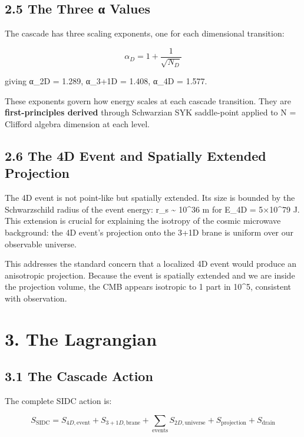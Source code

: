 \hypertarget{the-three-ux3b1-values}{%
\subsection{2.5 The Three α Values}\label{the-three-ux3b1-values}}

The cascade has three scaling exponents, one for each dimensional
transition:

\[\alpha_D = 1 + \frac{1}{\sqrt{N_D}}\]

giving α\_2D = 1.289, α\_3+1D = 1.408, α\_4D = 1.577.

These exponents govern how energy scales at each cascade transition.
They are \textbf{first-principles derived} through Schwarzian SYK
saddle-point applied to N = Clifford algebra dimension at each level.

\hypertarget{the-4d-event-and-spatially-extended-projection}{%
\subsection{2.6 The 4D Event and Spatially Extended
Projection}\label{the-4d-event-and-spatially-extended-projection}}

The 4D event is not point-like but spatially extended. Its size is
bounded by the Schwarzschild radius of the event energy: r\_s
\textasciitilde{} 10\^{}36 m for E\_4D = 5×10\^{}79 J. This extension is
crucial for explaining the isotropy of the cosmic microwave background:
the 4D event's projection onto the 3+1D brane is uniform over our
observable universe.

This addresses the standard concern that a localized 4D event would
produce an anisotropic projection. Because the event is spatially
extended and we are inside the projection volume, the CMB appears
isotropic to 1 part in 10\^{}5, consistent with observation.

\hypertarget{the-lagrangian}{%
\section{3. The Lagrangian}\label{the-lagrangian}}

\hypertarget{the-cascade-action}{%
\subsection{3.1 The Cascade Action}\label{the-cascade-action}}

The complete SIDC action is:

\[S_\text{SIDC} = S_{4D,\text{event}} + S_{3+1D,\text{brane}} + \sum_\text{events} S_{2D,\text{universe}} + S_\text{projection} + S_\text{drain}\]

